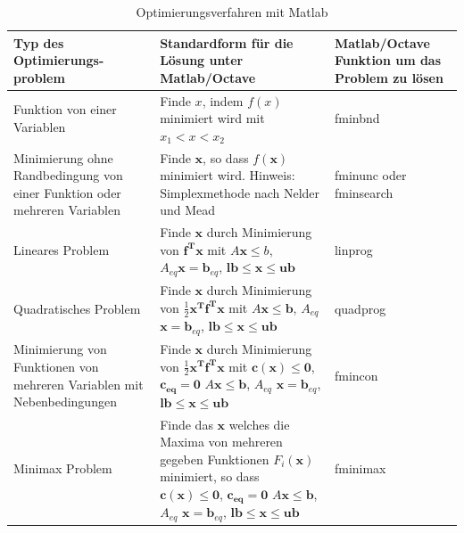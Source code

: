 \begin{table}[!ht]
	\caption{Optimierungsverfahren mit Matlab}
	\centering
	\begin{tabular}{p{5cm} | >{\centering\arraybackslash} p{6cm} | p{4cm}}  \hline 
		Typ des Optimierungs- \newline problem &  Standardform für die Lösung unter Matlab/Octave &  Matlab/Octave Funktion um das Problem zu lösen \\[1ex]
		\hline \hline 
		Funktion von einer  \newline Variablen  & Finde $x$, indem $f(x)$ minimiert wird mit
		$x_1 < x < x_2$ & \textsf{fminbnd} \\[1ex] \hline 
		Minimierung ohne Randbedingung von einer Funktion oder mehreren Variablen &
		Finde $\mathbf x$, so dass $f(\mathbf x)$ minimiert wird.
		Hinweis: Simplexmethode nach Nelder und Mead & 
		\textsf{fminunc} oder \newline \textsf{fminsearch} \\[1ex] \hline 
		Lineares Problem & Finde $\mathbf x $ durch Minimierung von $\mathbf{f^T x}$ mit $A \mathbf x \le b$, $A_{eq} \mathbf x = \mathbf b_{eq}$, \newline
		$\mathbf{lb} \le \mathbf{x} \le \mathbf{ub}$ & \textsf{linprog} \\[1ex] \hline
		Quadratisches Problem & Finde $\mathbf x $ durch Minimierung von $\frac{1}{2} \mathbf{x^T}\mathbf{f^T x}$ mit $A \mathbf x \le \mathbf b$, 
		\newline $A_{eq}$ $\mathbf x = \mathbf b_{eq}$, \newline
		$\mathbf{lb} \le \mathbf{x} \le \mathbf{ub}$ & \textsf{quadprog} \\[1ex] \hline
		Minimierung von Funktionen von mehreren Variablen mit Nebenbedingungen &
		Finde $\mathbf x $ durch Minimierung von $\frac{1}{2} \mathbf{x^T}\mathbf{f^T x}$ mit $\mathbf{c(x) \le 0}$, 
		$\mathbf{c_{eq} = 0}$ \newline
		$A \mathbf x \le \mathbf b$, 
		$A_{eq}$ $\mathbf x = \mathbf b_{eq}$, \newline
		$\mathbf{lb} \le \mathbf x \le \mathbf{ub}$ & \textsf{fmincon} \\[1ex] \hline
		Minimax Problem & Finde das  $\mathbf x $ welches die Maxima
		von mehreren gegeben Funktionen $F_i(\mathbf x)$ minimiert, 
		so dass  $\mathbf{c(x) \le 0}$, 
		$\mathbf{c_{eq} = 0}$ \newline
		$A \mathbf x \le \mathbf b$, 
		$A_{eq}$ $\mathbf x = \mathbf b_{eq}$, \newline
		$\mathbf{lb} \le \mathbf x \le \mathbf{ub}$ & \textsf{fminimax} \\[1ex] \hline
	\end{tabular}
	\label{tab:Optimierungsverfahren}
\end{table}

